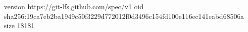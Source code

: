 version https://git-lfs.github.com/spec/v1
oid sha256:19ca7eb2ba1949c50f3229d772012f0d3496c154fd100e116ec141eabd68506a
size 18181
